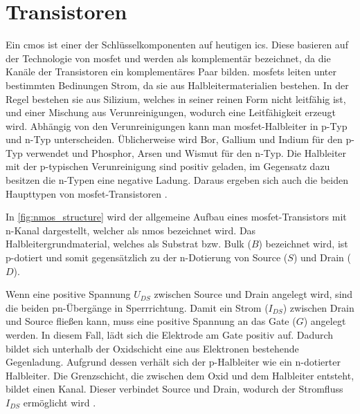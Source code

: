\section{Transistoren}
Ein \gls{cmos} ist einer der Schlüsselkomponenten auf heutigen \glspl{ic}. Diese basieren auf der Technologie von \gls{mosfet} und werden als komplementär bezeichnet, da die Kanäle der Transistoren ein komplementäres Paar bilden. \glspl{mosfet} leiten unter bestimmten Bedinungen Strom, da sie aus Halbleitermaterialien bestehen. In der Regel bestehen sie aus Silizium, welches in seiner reinen Form nicht leitfähig ist, und einer Mischung aus Verunreinigungen, wodurch eine Leitfähigkeit erzeugt wird. Abhängig von den Verunreinigungen kann man \gls{mosfet}-Halbleiter in p-Typ und n-Typ unterscheiden. Üblicherweise wird Bor, Gallium und Indium für den p-Typ verwendet und Phosphor, Arsen und Wismut für den n-Typ. Die Halbleiter mit der p-typischen Verunreinigung sind positiv geladen, im Gegensatz dazu besitzen die n-Typen eine negative Ladung. Daraus ergeben sich auch die beiden Haupttypen von \gls{mosfet}-Transistoren \cite{What_is_CMOS}\cite{Göbel2019}. 

In \autoref{fig:nmos_structure} wird der allgemeine Aufbau eines \gls{mosfet}-Transistors mit n-Kanal dargestellt, welcher als \gls{nmos} bezeichnet wird. Das Halbleitergrundmaterial, welches als Substrat bzw. Bulk ($B$) bezeichnet wird, ist p-dotiert und somit gegensätzlich zu der n-Dotierung von Source ($S$) und Drain ($D$). 

Wenn eine positive Spannung $U_{DS}$ zwischen Source und Drain angelegt wird, sind die beiden pn-Übergänge in Sperrrichtung. Damit ein Strom ($I_{DS}$) zwischen Drain und Source fließen kann, muss eine positive Spannung an das Gate ($G$) angelegt werden. In diesem Fall, lädt sich die Elektrode am Gate positiv auf. Dadurch bildet sich unterhalb der Oxidschicht eine aus Elektronen bestehende Gegenladung. Aufgrund dessen verhält sich der p-Halbleiter wie ein n-dotierter Halbleiter. Die Grenzschicht, die zwischen dem Oxid und dem Halbleiter entsteht, bildet einen Kanal. Dieser verbindet Source und Drain, wodurch der Stromfluss $I_{DS}$ ermöglicht wird \cite{Göbel2019}. 

